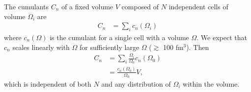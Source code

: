 \documentclass{article}
\begin{document}
The cumulants $C_n$ of a fixed volume $V$ composed of $N$ independent cells of volume ${\Omega_i}$ are
\begin{align*}
C_n &= \sum_i c_n (\Omega_i)
\end{align*}
where $c_n (\Omega)$ is the cumulant for a single cell with a volume $\Omega$. We expect that $c_n$ scales linearly with $\Omega$ for sufficiently large $\Omega$ ($\gtrsim$ 100 fm$^3$). Then
\begin{align*}
C_n &= \sum_i \frac{\Omega_i}{\Omega_0} c_n (\Omega_0) \\
&= \frac{c_n (\Omega_0)}{\Omega_0} V,
\end{align*}
which is independent of both $N$ and any distribution of $\Omega_i$ within the volume.
\end{document}
